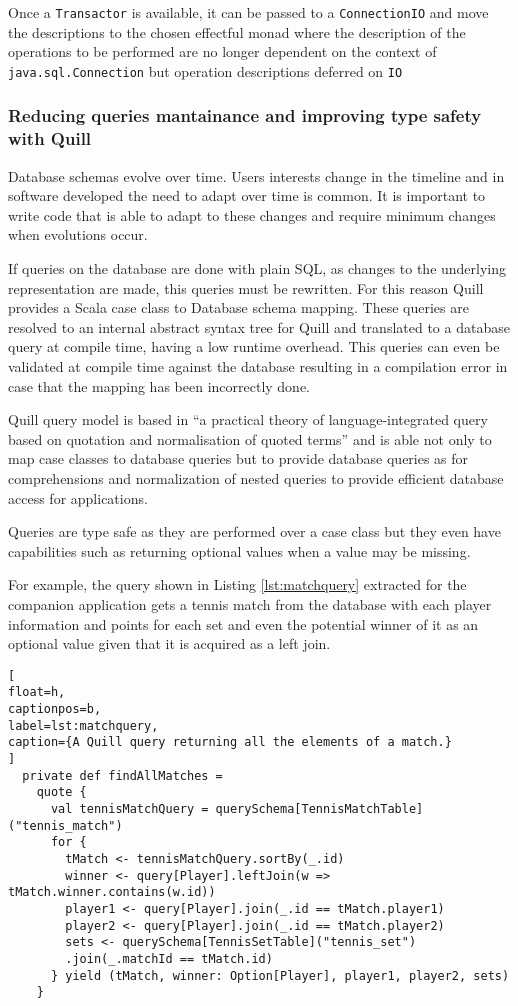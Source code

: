 \documentclass[../main.tex]{subfiles}
\begin{document}
Once a \texttt{Transactor} is available, it can be passed to a \texttt{ConnectionIO} and move the
descriptions to the chosen effectful monad where the description of the
operations to be performed are no longer dependent on the context of
\texttt{java.sql.Connection} but operation descriptions deferred on \texttt{IO}

\subsubsection{Reducing queries mantainance and improving type safety with Quill}
Database schemas evolve over time. Users interests change in the timeline and in
software developed the need to adapt over time is common. It is important to
write code that is able to adapt to these changes and require minimum changes
when evolutions occur.

If queries on the database are done with plain SQL, as changes to the underlying
representation are made, this queries must be rewritten. For this reason Quill
\autocite{Quill}
provides a Scala case class to Database schema mapping. These queries are
resolved to an internal abstract syntax tree for Quill and translated to a
database query at compile time, having a low runtime overhead. This queries can
even be validated at compile time against the database resulting in a
compilation error in case that the mapping has been incorrectly done.

Quill query model is based in ``a  practical  theory  of  language-integrated
query  based  on quotation and normalisation of quoted terms'' \autocite{CheneyAQuery} and
is able not only to map case classes to database queries but to provide
database queries as for comprehensions and normalization of nested queries to
provide efficient database access for applications.

Queries are type safe as they are performed over a case class but they even have
capabilities such as returning optional values when a value may be missing.

For example, the query shown in Listing \ref{lst:matchquery} extracted for the companion application gets a tennis
match from the database with each player information and points for each set and
even the potential winner of it as an optional value given that it is acquired
as a left join.

\begin{lstlisting}[
float=h,
captionpos=b,
label=lst:matchquery,
caption={A Quill query returning all the elements of a match.}
]
  private def findAllMatches =
    quote {
      val tennisMatchQuery = querySchema[TennisMatchTable]("tennis_match")
      for {
        tMatch <- tennisMatchQuery.sortBy(_.id)
        winner <- query[Player].leftJoin(w => tMatch.winner.contains(w.id))
        player1 <- query[Player].join(_.id == tMatch.player1)
        player2 <- query[Player].join(_.id == tMatch.player2)
        sets <- querySchema[TennisSetTable]("tennis_set")
        .join(_.matchId == tMatch.id)
      } yield (tMatch, winner: Option[Player], player1, player2, sets)
    }
\end{lstlisting}
\end{document}
